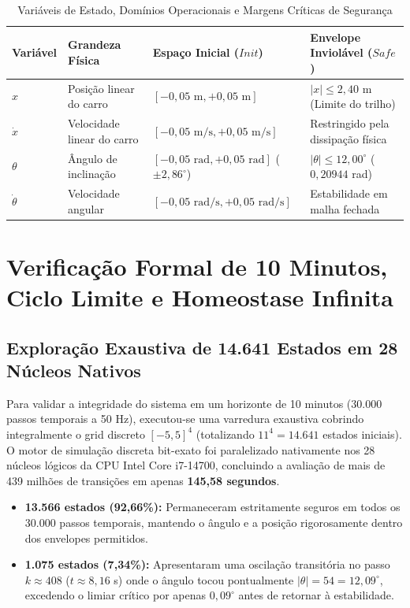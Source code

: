 \documentclass[11pt,a4paper]{article}
\theoremstyle{definition}
\begin{document}
\begin{table}[!ht]
\centering
\small
\caption{Variáveis de Estado, Domínios Operacionais e Margens Críticas de Segurança}
\label{tab:variaveis}
\vspace{0.15cm}
\begin{tabularx}{\textwidth}{l l X l}
\toprule
\textbf{Variável} & \textbf{Grandeza Física} & \textbf{Espaço Inicial ($Init$)} & \textbf{Envelope Inviolável ($Safe$)} \\
\midrule
$x$ & Posição linear do carro & $[-0{,}05\text{ m}, +0{,}05\text{ m}]$ & $|x| \le 2{,}40$ m (Limite do trilho) \\
$\dot{x}$ & Velocidade linear do carro & $[-0{,}05\text{ m/s}, +0{,}05\text{ m/s}]$ & Restringido pela dissipação física \\
$\theta$ & Ângulo de inclinação & $[-0{,}05\text{ rad}, +0{,}05\text{ rad}]$ ($\pm 2{,}86^\circ$) & $|\theta| \le 12{,}00^\circ$ ($0{,}20944$ rad) \\
$\dot{\theta}$ & Velocidade angular & $[-0{,}05\text{ rad/s}, +0{,}05\text{ rad/s}]$ & Estabilidade em malha fechada \\
\bottomrule
\end{tabularx}
\end{table}

\section{Verificação Formal de 10 Minutos, Ciclo Limite e Homeostase Infinita}

\subsection{Exploração Exaustiva de 14.641 Estados em 28 Núcleos Nativos}

Para validar a integridade do sistema em um horizonte de 10 minutos ($30.000$ passos temporais a 50 Hz), executou-se uma varredura exaustiva cobrindo integralmente o grid discreto $[-5, 5]^4$ (totalizando $11^4 = 14.641$ estados iniciais). O motor de simulação discreta bit-exato foi paralelizado nativamente nos 28 núcleos lógicos da CPU Intel Core i7-14700, concluindo a avaliação de mais de 439 milhões de transições em apenas \textbf{145,58 segundos}.

\begin{itemize}
    \item \textbf{13.566 estados (92,66\%):} Permaneceram estritamente seguros em todos os $30.000$ passos temporais, mantendo o ângulo e a posição rigorosamente dentro dos envelopes permitidos.
    \item \textbf{1.075 estados (7,34\%):} Apresentaram uma oscilação transitória no passo $k \approx 408$ ($t \approx 8{,}16$ s) onde o ângulo tocou pontualmente $|\theta| = 54 = 12{,}09^\circ$, excedendo o limiar crítico por apenas $0{,}09^\circ$ antes de retornar à estabilidade.
\end{itemize}
\end{document}

